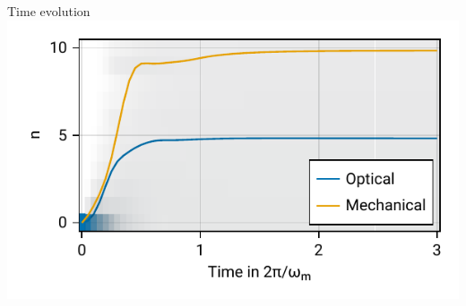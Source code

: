 \documentclass{beamer}
\begin{document}
\begin{frame}{Time evolution}
	\centering
	\includegraphics{figures/02 time evolution.pdf}
\end{frame}


{
	\begin{frame}[plain]{}\end{frame}
}
\end{document}
